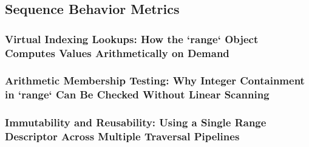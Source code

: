 \subsection{Sequence Behavior Metrics}
\subsubsection{Virtual Indexing Lookups: How the `range` Object Computes Values Arithmetically on Demand}
\subsubsection{Arithmetic Membership Testing: Why Integer Containment in `range` Can Be Checked Without Linear Scanning}
\subsubsection{Immutability and Reusability: Using a Single Range Descriptor Across Multiple Traversal Pipelines}
